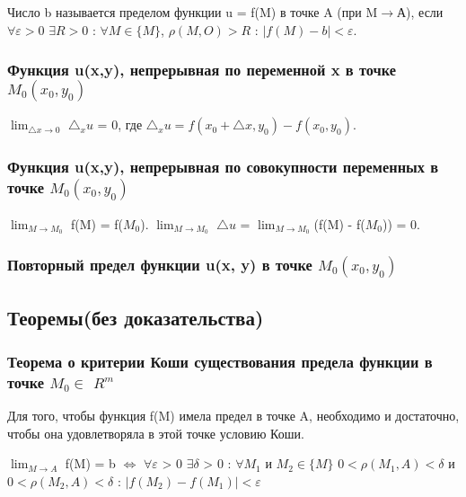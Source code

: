 \documentclass[a4paper, 12pt]{article}
\renewcommand{\epsilon}{\varepsilon}
\newcommand{\Rm}{\texorpdfstring{$R^m$}{Lg}}
\def\newline{}%
\begin{document}
            Число b называется пределом функции u = f(M) в точке A (при M$\rightarrow$А), если
            $\forall \epsilon > 0$ $\exists R > 0$ : $\forall M \in \{M\}$, $\rho(M, O) > R$ :
            $|f(M) - b| < \epsilon$.

            \subsubsection{Функция u(x,y), непрерывная по переменной x в точке \texorpdfstring{$M_0(x_0, y_0)$}{Lg}}

            $\displaystyle{\lim_{\triangle x \rightarrow 0}}$ ${\triangle}_x u$ = 0, где 
            ${\triangle}_x u = f(x_0 + \triangle x, y_0) - f(x_0, y_0)$.

            \subsubsection{Функция u(x,y), непрерывная по совокупности переменных в точке \texorpdfstring{$M_0(x_0, y_0)$}{Lg}}

            $\displaystyle{\lim_{M \rightarrow M_0}}$ f(M) = f($M_0$). $\displaystyle{\lim_{M \rightarrow M_0}}$
            $\triangle u$ = $\displaystyle{\lim_{M \rightarrow M_0}} $(f(M) - f($M_0$)) = 0.

            \subsubsection{Повторный предел функции u(x, y)  в точке \texorpdfstring{$M_0(x_0, y_0)$}{Lg}}

        \subsection{Теоремы(без доказательства)}
            \subsubsection{Теорема о критерии Коши существования предела функции в точке \texorpdfstring{$M_0 \in$}{Lg} \Rm}

            Для того, чтобы функция f(M) имела предел в точке A, необходимо и достаточно, чтобы она удовлетворяла
            в этой точке условию Коши.

            $\displaystyle{\lim_{M \rightarrow A}}$ f(M) = b $\Leftrightarrow$ $\forall \epsilon$ > 0
            $\exists \delta$ > 0 : $\forall M_1$ и $M_2 \in \{M\}$ $0 < \rho(M_1, A) < \delta$ и \newline
            $0 < \rho(M_2, A) < \delta$ : $|f(M_2) - f(M_1)| < \epsilon$
\end{document}
